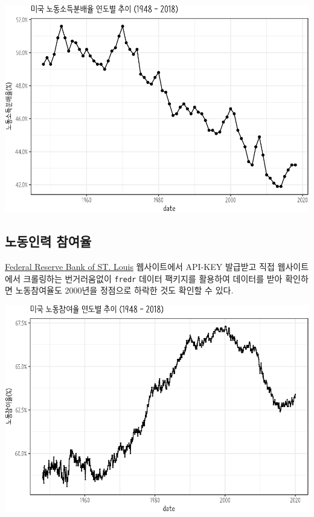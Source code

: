 \documentclass[smallextended]{svjour3}       %
\begin{document}
\begin{center}\includegraphics[width=1\linewidth]{paper_files/figure-latex/labor-share-us-1} \end{center}

\hypertarget{labor-participation}{%
\subsection{노동인력 참여율}\label{labor-participation}}

\href{https://research.stlouisfed.org/docs/api/api_key.html}{Federal
Reserve Bank of ST. Louis} 웹사이트에서 API-KEY 발급받고 직접
웹사이트에서 크롤링하는 번거러움없이 \texttt{fredr} 데이터 팩키지를
활용하여 데이터를 받아 확인하면 노동참여율도 2000년을 정점으로 하락한
것도 확인할 수 있다.

\begin{center}\includegraphics[width=1\linewidth]{paper_files/figure-latex/fred-data-labor-participation-1} \end{center}
\end{document}
